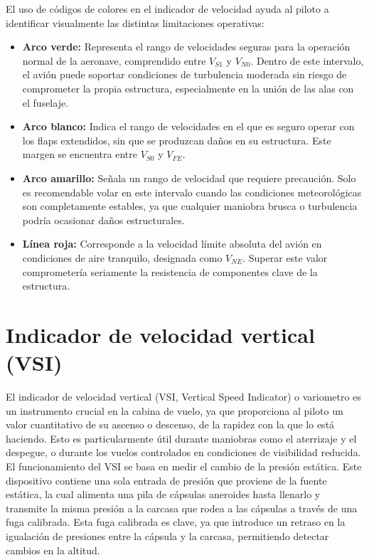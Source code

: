 El uso de códigos de colores en el indicador de velocidad ayuda al piloto a identificar visualmente las distintas limitaciones operativas:

\begin{itemize} 
	\item \textbf{Arco verde:} Representa el rango de velocidades seguras para la operación normal de la aeronave, comprendido entre \(V_{S1}\) y \(V_{N0}\). Dentro de este intervalo, el avión puede soportar condiciones de turbulencia moderada sin riesgo de comprometer la propia estructura, especialmente en la unión de las alas con el fuselaje.
	
	\item \textbf{Arco blanco:} Indica el rango de velocidades en el que es seguro operar con los flaps extendidos, sin que se produzcan daños en su estructura. Este margen se encuentra entre \(V_{S0}\) y \(V_{FE}\).
	
	\item \textbf{Arco amarillo:} Señala un rango de velocidad que requiere precaución. Solo es recomendable volar en este intervalo cuando las condiciones meteorológicas son completamente estables, ya que cualquier maniobra brusca o turbulencia podría ocasionar daños estructurales.
	
	\item \textbf{Línea roja:} Corresponde a la velocidad límite absoluta del avión en condiciones de aire tranquilo, designada como \(V_{NE}\). Superar este valor comprometería seriamente la resistencia de componentes clave de la estructura. \end{itemize}

\section{Indicador de velocidad vertical (VSI)}

El indicador de velocidad vertical (VSI, Vertical Speed Indicator) o variometro es un instrumento crucial en la cabina de vuelo, ya que proporciona al piloto un valor cuantitativo de su ascenso o descenso, de la rapidez con la que lo está haciendo. Esto es particularmente útil durante maniobras como el aterrizaje y el despegue, o durante los vuelos controlados en condiciones de visibilidad reducida.\\

El funcionamiento del VSI se basa en medir el cambio de la presión estática. Este dispositivo contiene una sola entrada de presión que proviene de la fuente estática, la cual alimenta una pila de cápsulas aneroides hasta llenarlo y transmite la misma presión a la carcasa que rodea a las cápsulas a través de una fuga calibrada. Esta fuga calibrada es clave, ya que introduce un retraso en la igualación de presiones entre la cápsula y la carcasa, permitiendo detectar cambios en la altitud.\\


